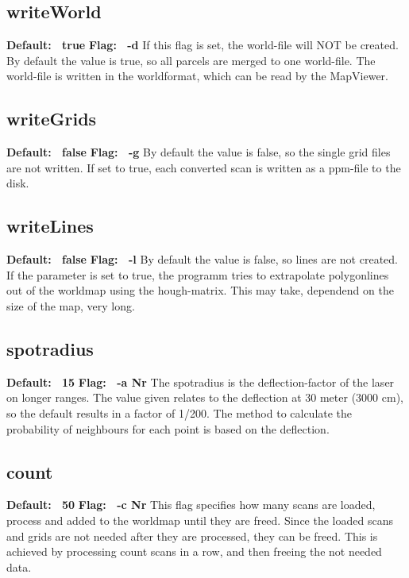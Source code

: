 \documentclass{article}
\begin{document}
\subsection{writeWorld}
{\bf Default: \ true} \newline
{\bf Flag: \ -d} \newline
If this flag is set, the world-file will NOT be created. By default the value is true, so all parcels are merged to one world-file. The world-file is written in the worldformat, which can be read by the MapViewer.

\subsection{writeGrids}
{\bf Default: \ false} \newline
{\bf Flag: \ -g} \newline
By default the value is false, so the single grid files are not written. If set
to true, each converted scan is written as a ppm-file to the disk.

\subsection{writeLines}
{\bf Default: \ false} \newline
{\bf Flag: \ -l} \newline
By default the value is false, so lines are not created. If the parameter is
set to true, the programm tries to extrapolate polygonlines out of the
worldmap using the hough-matrix.
This may take, dependend on the size of the map, very long.

\subsection{spotradius}
{\bf Default: \ 15} \newline
{\bf Flag: \ -a Nr} \newline
The spotradius is the deflection-factor of the laser on longer ranges. The
value given relates to the deflection at 30 meter (3000 cm), so the default
results in a factor of 1/200. The method to calculate the probability of
neighbours for each point is based on the deflection.

\subsection{count}
{\bf Default: \ 50} \newline
{\bf Flag: \ -c Nr} \newline
This flag specifies how many scans are loaded, process and added to the worldmap
until they are freed. Since the loaded scans and grids are not needed after
they are processed, they can be freed. This is achieved by processing count
scans in a row, and then freeing the not needed data.
\end{document}

